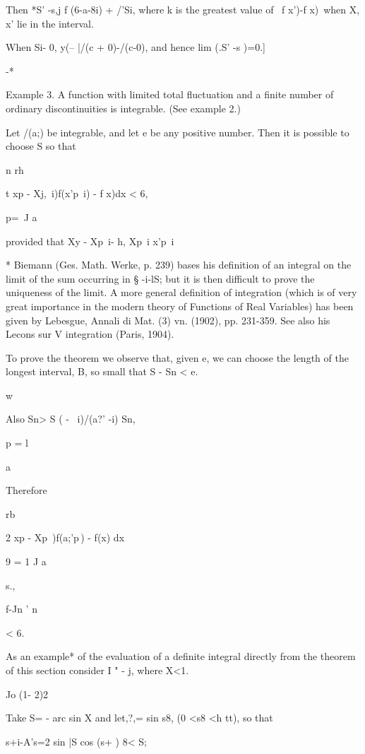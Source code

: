 Then *S' -s,j f (6-a-8i) + /'Si, where k is the greatest value of \ f
x')-f x)\, when X, x' lie in the interval.

When Si- 0, y(-- |/(c + 0)-/(c-0), and hence lim (.S' -s )=0.]

 -*

Example 3. A function with limited total fluctuation and a finite
number of ordinary discontinuities is integrable. (See  example
2.)


Let /(a;) be integrable, and let e be any positive number. Then it is
possible to choose S so that

n rh

t xp - Xj,\ i)f(x'p\ i) - f x)dx < 6,

p=\ J a

provided that Xy - Xp\ i- h, Xp\ i x'p\ i%

* Biemann (Ges. Math. Werke, p. 239) bases his definition of an
integral on the limit of the sum occurring in § -i-lS; but it is then
difficult to prove the uniqueness of the limit. A more general
definition of integration (which is of very great importance in the
modern theory of Functions of Real Variables) has been given by
Lebesgue, Annali di Mat. (3) vn. (1902), pp. 231-359. See also his
Lecons sur V integration (Paris, 1904).

%
%

To prove the theorem we observe that, given e, we can choose the
length of the longest interval, B, so small that S - Sn < e.

w

Also Sn> S ( - \ i)/(a?' -i) Sn,

p = l

  a

Therefore

  rb

2 xp - Xp\ )f(a;'p\,) - f(x) dx

9 = 1 J a

 s.,

  f-Jn ' n

< 6.

As an example* of the evaluation of a definite integral directly from
the theorem of this section consider I " - j, where X<1.

Jo (1- 2)2

Take S= - arc sin X and let,?,= sin s8, (0 <s8 <h tt), so that

 s+i-A's=2 sin |S cos (s+ ) 8< S;

